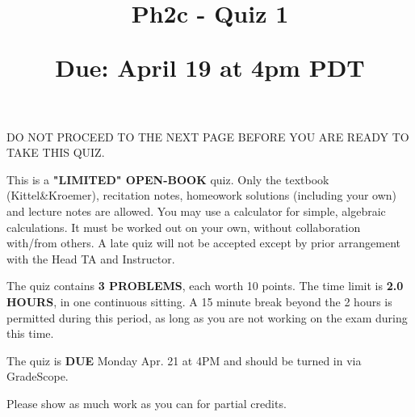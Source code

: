\documentclass{article}
\theoremstyle{defi}
\newcommand{\bt}{\textbf}
\begin{document}
  
\SetBgHshift{-2.5cm}
\SetBgVshift{-1cm}

\title{\vspace{-3cm}  \bt{Ph2c - Quiz 1}\\
\begin{large}
Due: April 19 at 4pm PDT
\end{large}
} 
\date{\vspace{-5ex}}
\maketitle

\begin{center}
    {\Large DO NOT PROCEED TO THE NEXT PAGE BEFORE YOU ARE READY TO TAKE THIS QUIZ.}
\end{center}

\vspace{15mm}

This is a \textbf{"LIMITED" OPEN-BOOK} quiz. Only the textbook (Kittel\&Kroemer), recitation notes, homeowork solutions (including your own) and lecture notes are allowed. You may use a calculator for simple, algebraic calculations. It must be worked out on your own, without collaboration with/from others. A late quiz will not be accepted except by prior arrangement with the Head TA and Instructor.

\vspace{5mm}
The quiz contains \textbf{3 PROBLEMS}, each worth 10 points. The time limit is \textbf{2.0 HOURS}, in one continuous sitting. A 15 minute break beyond the 2 hours is permitted during this period, as long as you are not working on the exam during this time. 

\vspace{5mm}
The quiz is \textbf{DUE} Monday Apr. 21 at 4PM and should be turned in via GradeScope. 

\vspace{5mm}
Please show as much work as you can for partial credits.

\pagebreak
\end{document}
